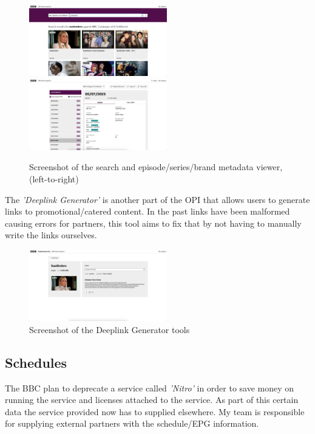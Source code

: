 \documentclass{article}
\begin{document}
  \begin{figure}[H]
    \centering
    \includegraphics[width=6cm]{assets/OPI-search.png}
    \includegraphics[width=6cm]{assets/OPI-detail.png}
    \caption{Screenshot of the search and episode/series/brand metadata viewer, (left-to-right)}
    \label{fig:opiMetadataOverview}
  \end{figure}
  
  The \textit{'Deeplink Generator'} is another part of the OPI that allows users to generate links to promotional/catered content. In the past links have been 
  malformed causing errors for partners, this tool aims to fix that by not having to manually write the links ourselves.

  \begin{figure}[H]
    \centering
    \includegraphics[width=6cm]{assets/OPI-deeplink.png}
    \caption{Screenshot of the Deeplink Generator tools}
    \label{fig:opiDeeplinkOVerview}
  \end{figure}

  \subsection{Schedules}
  The BBC plan to deprecate a service called \textit{'Nitro'} in order to save money on running the service and licenses attached to the service. As part of this
  certain data the service provided now has to supplied elsewhere. My team is responsible for supplying external partners with the schedule/EPG information.
  
\end{document}
